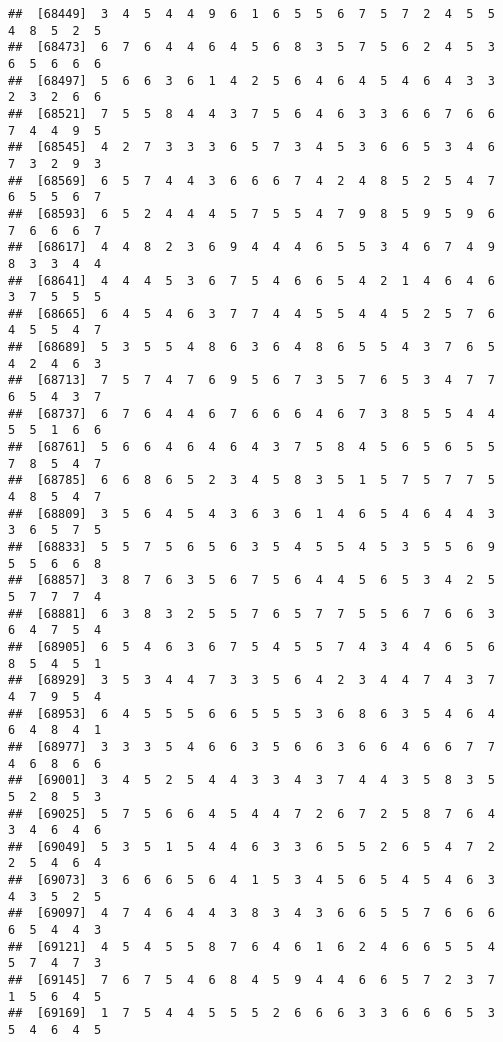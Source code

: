 \documentclass[
]{book}
\begin{document}
\begin{verbatim}
##  [68449]  3  4  5  4  4  9  6  1  6  5  5  6  7  5  7  2  4  5  5  4  8  5  2  5
##  [68473]  6  7  6  4  4  6  4  5  6  8  3  5  7  5  6  2  4  5  3  6  5  6  6  6
##  [68497]  5  6  6  3  6  1  4  2  5  6  4  6  4  5  4  6  4  3  3  2  3  2  6  6
##  [68521]  7  5  5  8  4  4  3  7  5  6  4  6  3  3  6  6  7  6  6  7  4  4  9  5
##  [68545]  4  2  7  3  3  3  6  5  7  3  4  5  3  6  6  5  3  4  6  7  3  2  9  3
##  [68569]  6  5  7  4  4  3  6  6  6  7  4  2  4  8  5  2  5  4  7  6  5  5  6  7
##  [68593]  6  5  2  4  4  4  5  7  5  5  4  7  9  8  5  9  5  9  6  7  6  6  6  7
##  [68617]  4  4  8  2  3  6  9  4  4  4  6  5  5  3  4  6  7  4  9  8  3  3  4  4
##  [68641]  4  4  4  5  3  6  7  5  4  6  6  5  4  2  1  4  6  4  6  3  7  5  5  5
##  [68665]  6  4  5  4  6  3  7  7  4  4  5  5  4  4  5  2  5  7  6  4  5  5  4  7
##  [68689]  5  3  5  5  4  8  6  3  6  4  8  6  5  5  4  3  7  6  5  4  2  4  6  3
##  [68713]  7  5  7  4  7  6  9  5  6  7  3  5  7  6  5  3  4  7  7  6  5  4  3  7
##  [68737]  6  7  6  4  4  6  7  6  6  6  4  6  7  3  8  5  5  4  4  5  5  1  6  6
##  [68761]  5  6  6  4  6  4  6  4  3  7  5  8  4  5  6  5  6  5  5  7  8  5  4  7
##  [68785]  6  6  8  6  5  2  3  4  5  8  3  5  1  5  7  5  7  7  5  4  8  5  4  7
##  [68809]  3  5  6  4  5  4  3  6  3  6  1  4  6  5  4  6  4  4  3  3  6  5  7  5
##  [68833]  5  5  7  5  6  5  6  3  5  4  5  5  4  5  3  5  5  6  9  5  5  6  6  8
##  [68857]  3  8  7  6  3  5  6  7  5  6  4  4  5  6  5  3  4  2  5  5  7  7  7  4
##  [68881]  6  3  8  3  2  5  5  7  6  5  7  7  5  5  6  7  6  6  3  6  4  7  5  4
##  [68905]  6  5  4  6  3  6  7  5  4  5  5  7  4  3  4  4  6  5  6  8  5  4  5  1
##  [68929]  3  5  3  4  4  7  3  3  5  6  4  2  3  4  4  7  4  3  7  4  7  9  5  4
##  [68953]  6  4  5  5  5  6  6  5  5  5  3  6  8  6  3  5  4  6  4  6  4  8  4  1
##  [68977]  3  3  3  5  4  6  6  3  5  6  6  3  6  6  4  6  6  7  7  4  6  8  6  6
##  [69001]  3  4  5  2  5  4  4  3  3  4  3  7  4  4  3  5  8  3  5  5  2  8  5  3
##  [69025]  5  7  5  6  6  4  5  4  4  7  2  6  7  2  5  8  7  6  4  3  4  6  4  6
##  [69049]  5  3  5  1  5  4  4  6  3  3  6  5  5  2  6  5  4  7  2  2  5  4  6  4
##  [69073]  3  6  6  6  5  6  4  1  5  3  4  5  6  5  4  5  4  6  3  4  3  5  2  5
##  [69097]  4  7  4  6  4  4  3  8  3  4  3  6  6  5  5  7  6  6  6  6  5  4  4  3
##  [69121]  4  5  4  5  5  8  7  6  4  6  1  6  2  4  6  6  5  5  4  5  7  4  7  3
##  [69145]  7  6  7  5  4  6  8  4  5  9  4  4  6  6  5  7  2  3  7  1  5  6  4  5
##  [69169]  1  7  5  4  4  5  5  5  2  6  6  6  3  3  6  6  6  5  3  5  4  6  4  5

\end{verbatim}
\end{document}
